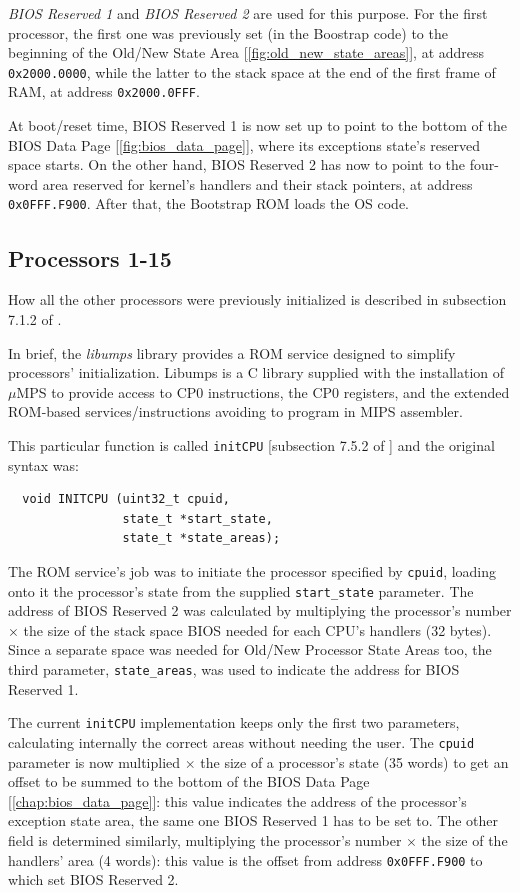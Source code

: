 \documentclass[12pt,a4paper,openright,twoside]{report}
\begin{document}
\textit{BIOS Reserved 1} and \textit{BIOS Reserved 2} are used for this purpose.
For the first processor, the first one was previously set (in the Boostrap code) to the beginning of the Old/New State Area [\autoref{fig:old_new_state_areas}], at address \texttt{0x2000.0000}, while the latter to the stack space at the end of the first frame of RAM, at address \texttt{0x2000.0FFF}.

At boot/reset time, BIOS Reserved 1 is now set up to point to the bottom of the BIOS Data Page [\autoref{fig:bios_data_page}], where its exceptions state's reserved space starts.
On the other hand, BIOS Reserved 2 has now to point to the four-word area reserved for kernel's handlers and their stack pointers, at address \texttt{0x0FFF.F900}. After that, the Bootstrap ROM loads the OS code.

\subsection{Processors 1-15}
How all the other processors were previously initialized is described in subsection 7.1.2 of \cite{old_pops}.

In brief, the \textit{libumps} library provides a ROM service designed to simplify processors' initialization.
Libumps is a C library supplied with the installation of $\mu$MPS to provide access to CP0 instructions, the CP0 registers, and the extended ROM-based services/instructions avoiding to program in MIPS assembler.

This particular function is called \texttt{initCPU} [subsection 7.5.2 of \cite{old_pops}] and the original syntax was:
\begin{verbatim}
  void INITCPU (uint32_t cpuid,
                state_t *start_state,
                state_t *state_areas);
\end{verbatim}

The ROM service's job was to initiate the processor specified by \texttt{cpuid}, loading onto it the processor's state from the supplied \texttt{start\_state} parameter.
The address of BIOS Reserved 2 was calculated by multiplying the processor's number $\times$ the size of the stack space BIOS needed for each CPU's handlers (32 bytes).
Since a separate space was needed for Old/New Processor State Areas too, the third parameter, \texttt{state\_areas}, was used to indicate the address for BIOS Reserved 1.

The current \texttt{initCPU} implementation keeps only the first two parameters, calculating internally the correct areas without needing the user.
The \texttt{cpuid} parameter is now multiplied $\times$ the size of a processor's state (35 words) to get an offset to be summed to the bottom of the BIOS Data Page [\autoref{chap:bios_data_page}]: this value indicates the address of the processor's exception state area, the same one BIOS Reserved 1 has to be set to.
The other field is determined similarly, multiplying the processor's number $\times$ the size of the handlers' area (4 words): this value is the offset from address \texttt{0x0FFF.F900} to which set BIOS Reserved 2.
\end{document}
